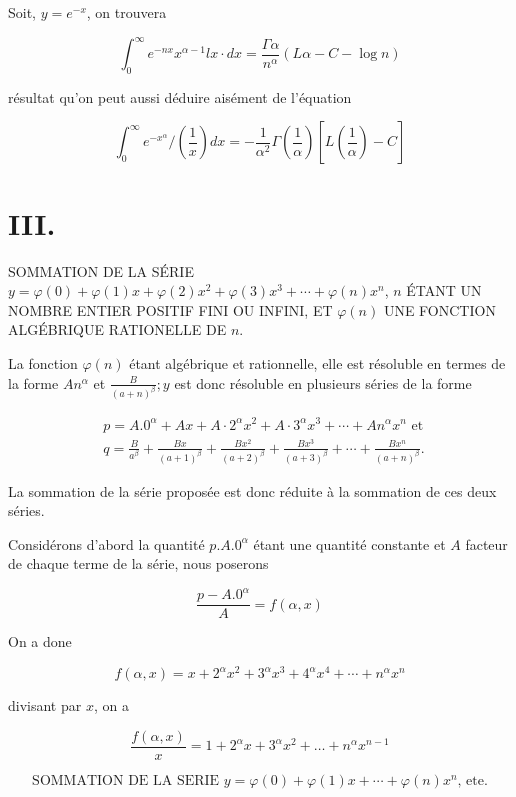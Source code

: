 \documentclass{article}
\begin{document}
Soit, \(y=e^{-x}\), on trouvera

\[
\int_{0}^{\infty} e^{-n x} x^{\alpha-1} l x \cdot d x=\frac{\Gamma \alpha}{n^{\alpha}}(L \alpha-C-\log n)
\]

résultat qu'on peut aussi déduire aisément de l'équation

\[
\int_{0}^{\infty} e^{-x^{\alpha}} /\left(\frac{1}{x}\right) d x=-\frac{1}{\alpha^{2}} \Gamma\left(\frac{1}{\alpha}\right)\left[L\left(\frac{1}{\alpha}\right)-C\right]
\]

\section*{III.}

SOMMATION DE LA SÉRIE \(y=\varphi(0)+\varphi(1) x+\varphi(2) x^{2}+\varphi(3) x^{3}+\cdots+\varphi(n) x^{n}\), \(n\) ÉTANT UN NOMBRE ENTIER POSITIF FINI OU INFINI, ET \(\varphi(n)\) UNE FONCTION ALGÉBRIQUE RATIONELLE DE \(n\).

La fonction \(\varphi(n)\) étant algébrique et rationnelle, elle est résoluble en termes de la forme \(A n^{\alpha}\) et \(\frac{B}{(a+n)^{\beta}} ; y\) est donc résoluble en plusieurs séries de la forme

\[
\begin{aligned}
& p=A .0^{\alpha}+A x+A \cdot 2^{\alpha} x^{2}+A \cdot 3^{\alpha} x^{3}+\cdots+A n^{\alpha} x^{n} \text { et } \\
& q=\frac{B}{a^{\beta}}+\frac{B x}{(a+1)^{\beta}}+\frac{B x^{2}}{(a+2)^{\beta}}+\frac{B x^{3}}{(a+3)^{\beta}}+\cdots+\frac{B x^{n}}{(a+n)^{\beta}} .
\end{aligned}
\]

La sommation de la série proposée est donc réduite à la sommation de ces deux séries.

Considérons d'abord la quantité \(p . A .0^{\alpha}\) étant une quantité constante et \(A\) facteur de chaque terme de la série, nous poserons

\[
\frac{p-A .0^{\alpha}}{A}=f(\alpha, x)
\]

On a done

\[
f(\alpha, x)=x+2^{\alpha} x^{2}+3^{\alpha} x^{3}+4^{\alpha} x^{4}+\cdots+n^{\alpha} x^{n}
\]

divisant par \(x\), on a

\[
\frac{f(\alpha, x)}{x}=1+2^{\alpha} x+3^{\alpha} x^{2}+\ldots+n^{\alpha} x^{n-1}
\]

\[
\text { SOMMATION DE LA SERIE } y=\varphi(0)+\varphi(1) x+\cdots+\varphi(n) x^{n} \text {, ete. }
\]
\end{document}

